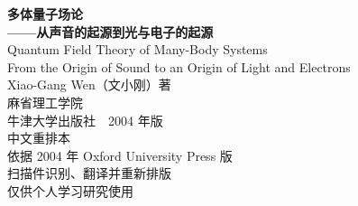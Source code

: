\documentclass[11pt,a4paper,twoside,openright]{ctexbook}
\begin{document}
\frontmatter
\begin{titlepage}
\centering
{\Huge\bfseries 多体量子场论\\[0.8em]
\huge ——从声音的起源到光与电子的起源\\[4em]}
{\Large Quantum Field Theory of Many-Body Systems\\[0.5em]
\large From the Origin of Sound to an Origin of Light and Electrons\\[3em]}
{\Large Xiao-Gang Wen（文小刚）\quad 著\\[1em]}
{\large 麻省理工学院\\[0.5em]}
{\large 牛津大学出版社　2004 年版\\[5em]}
{\large 中文重排本\\[0.5em]}
{\large 依据 2004 年 Oxford University Press 版\\[0.3em]
扫描件识别、翻译并重新排版\\[0.3em]
仅供个人学习研究使用\\[3em]}
\end{titlepage}
\thispagestyle{empty}\mbox{}\clearpage
\tableofcontents



\mainmatter













\end{document}
